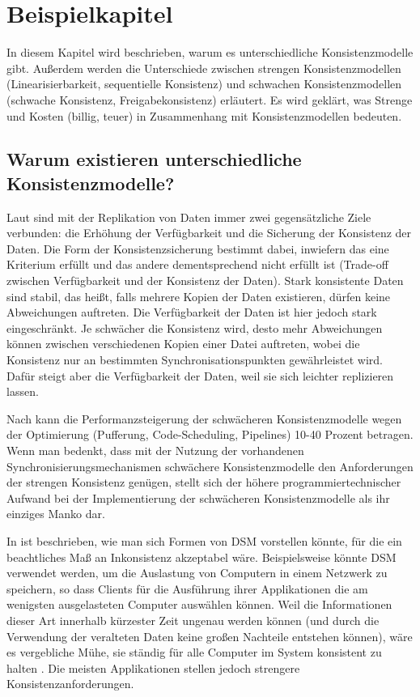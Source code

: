 \chapter{Beispielkapitel}

In diesem Kapitel wird beschrieben, warum es unterschiedliche Konsistenzmodelle gibt. Außerdem werden die Unterschiede zwischen strengen Konsistenzmodellen (Linearisierbarkeit, sequentielle Konsistenz) und schwachen Konsistenzmodellen (schwache Konsistenz, Freigabekonsistenz) erläutert. Es wird geklärt, was Strenge und Kosten (billig, teuer) in Zusammenhang mit Konsistenzmodellen bedeuten.

\section{Warum existieren unterschiedliche Konsistenzmodelle?}

Laut \cite{Malte:97} sind mit der Replikation von Daten immer zwei gegensätzliche Ziele verbunden: die Erhöhung der Verfügbarkeit und die Sicherung der Konsistenz der Daten. Die Form der Konsistenzsicherung bestimmt dabei, inwiefern das eine Kriterium erfüllt und das andere dementsprechend nicht erfüllt ist (Trade-off zwischen Verfügbarkeit und der Konsistenz der Daten). Stark konsistente Daten sind stabil, das heißt, falls mehrere Kopien der Daten existieren, dürfen keine Abweichungen auftreten. Die Verfügbarkeit der Daten ist hier jedoch stark eingeschränkt. Je schwächer die Konsistenz wird, desto mehr Abweichungen können zwischen verschiedenen Kopien einer Datei auftreten, wobei die Konsistenz nur an bestimmten Synchronisationspunkten gewährleistet wird. Dafür steigt aber die Verfügbarkeit der Daten, weil sie sich leichter replizieren lassen.

Nach \cite{Mosberger:93} kann die Performanzsteigerung der schwächeren Konsistenzmodelle wegen der Optimierung (Pufferung, Code-Scheduling, Pipelines) 10-40 Prozent betragen. Wenn man bedenkt, dass mit der Nutzung der vorhandenen Synchronisierungsmechanismen schwächere Konsistenzmodelle den Anforderungen der strengen Konsistenz genügen, stellt sich der höhere programmiertechnischer Aufwand bei der Implementierung der schwächeren Konsistenzmodelle als ihr einziges Manko dar.

In \cite{Cheriton:85} ist beschrieben, wie man sich Formen von DSM vorstellen könnte, für die ein beachtliches Maß an Inkonsistenz akzeptabel wäre. Beispielsweise könnte DSM verwendet werden, um die Auslastung von Computern in einem Netzwerk zu speichern, so dass Clients für die Ausführung ihrer Applikationen die am wenigsten ausgelasteten Computer auswählen können. Weil die Informationen dieser Art innerhalb kürzester Zeit ungenau werden können (und durch die Verwendung der veralteten Daten keine großen Nachteile entstehen können), wäre es vergebliche Mühe, sie ständig für alle Computer im System konsistent zu halten \cite{Coulouris:02}. Die meisten Applikationen stellen jedoch strengere Konsistenzanforderungen.


